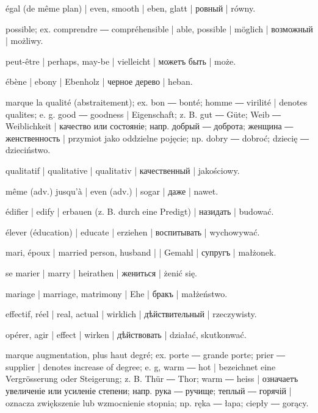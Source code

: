\begin{outdent}{1em}
égal (de même plan) | even, smooth | eben, glatt | ровный | równy.

possible; ex.  comprendre ― 
compréhensible | able, possible | möglich | возможный | możliwy.

\uvsubentry{}
peut-être | perhaps, may-be | vielleicht | можетъ быть | może.

ébène | ebony | Ebenholz | черное дерево | heban.

marque la qualité (abstraitement); ex.  bon ― 
bonté;  homme ―  virilité | denotes qualites;
e. g.  good ―  goodness | Eigenschaft; z. B. 
gut ―  Güte;  Weib ―  Weiblichkeit | качество или состояніе; напр.  добрый ―  доброта;
 женщина ―  женственность | przymiot jako
oddzielne pojęcie; np.  dobry ―  dobroć; 
dziecię ―  dzieciństwo.

\uvsubentry{}
qualitatif | qualitative | qualitativ | качественный | jakościowy.

même (adv.) jusqu’à | even (adv.) | sogar | даже | nawet.

édifier | edify | erbauen (z. B. durch eine Predigt) | назидать | budować.

élever (éducation) | educate | erziehen | воспитывать | wychowywać.

mari, époux | married person, husband |   | Gemahl | супругъ | małżonek.

\uvsubentry{}
se marier | marry | heirathen | жениться | żenić się.


\uvsubentry{}
mariage | marriage, matrimony | Ehe | бракъ | małżeństwo.

effectif, réel | real, actual | wirklich | дѣйствительный | rzeczywisty.

opérer, agir | effect | wirken | дѣйствовать | działać,
skutkonwać.

marque augmentation, plus haut degré; ex.  porte ―
 grande porte;  prier ―  supplier | denotes
increase of degree; e. g,  warm ―  hot | bezeichnet
eine Vergrösserung oder Steigerung; z. B.  Thür ― 
Thor;  warm ―  heiss | означаетъ увеличеніе или
усиленіе степени; напр.  рука ―  ручище; 
теплый ―  горячій | oznacza zwiększenie lub wzmocnienie
stopnia; np.  ręka ―  łapa;  ciepły ―
 gorący.


\end{outdent}
